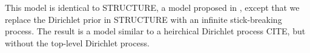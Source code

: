 This model is identical to STRUCTURE,
a model proposed in \citet{pritchard:2000:structure, raj:2014:faststructure},
except that we replace the Dirichlet prior in STRUCTURE
with an infinite stick-breaking process.
The result is a model similar to a heirchical Dirichlet process CITE,
but without the top-level Dirichlet process.


